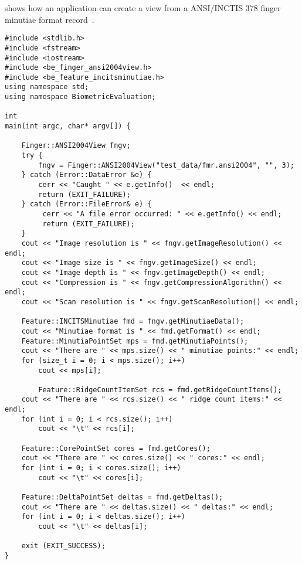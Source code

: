  shows how an application can create a view from
a ANSI/INCTIS 378 finger minutiae format record~\cite{std:ansi378-2004}.

\begin{lstlisting}[caption={Using an INCITS Finger View}, label=lst:incitsfingerviewuse]
#include <stdlib.h>
#include <fstream>
#include <iostream>
#include <be_finger_ansi2004view.h>
#include <be_feature_incitsminutiae.h>
using namespace std;
using namespace BiometricEvaluation;

int
main(int argc, char* argv[]) {

    Finger::ANSI2004View fngv;
    try {
        fngv = Finger::ANSI2004View("test_data/fmr.ansi2004", "", 3);
    } catch (Error::DataError &e) {
        cerr << "Caught " << e.getInfo()  << endl;
        return (EXIT_FAILURE);
    } catch (Error::FileError& e) {
         cerr << "A file error occurred: " << e.getInfo() << endl;
         return (EXIT_FAILURE);
    }
    cout << "Image resolution is " << fngv.getImageResolution() << endl;
    cout << "Image size is " << fngv.getImageSize() << endl;
    cout << "Image depth is " << fngv.getImageDepth() << endl;
    cout << "Compression is " << fngv.getCompressionAlgorithm() << endl;
    cout << "Scan resolution is " << fngv.getScanResolution() << endl;
    
    Feature::INCITSMinutiae fmd = fngv.getMinutiaeData();
    cout << "Minutiae format is " << fmd.getFormat() << endl;
    Feature::MinutiaPointSet mps = fmd.getMinutiaPoints();
    cout << "There are " << mps.size() << " minutiae points:" << endl;
    for (size_t i = 0; i < mps.size(); i++)
        cout << mps[i];

        Feature::RidgeCountItemSet rcs = fmd.getRidgeCountItems();
    cout << "There are " << rcs.size() << " ridge count items:" << endl;
    for (int i = 0; i < rcs.size(); i++)
        cout << "\t" << rcs[i];

    Feature::CorePointSet cores = fmd.getCores();
    cout << "There are " << cores.size() << " cores:" << endl;
    for (int i = 0; i < cores.size(); i++)
        cout << "\t" << cores[i];

    Feature::DeltaPointSet deltas = fmd.getDeltas();
    cout << "There are " << deltas.size() << " deltas:" << endl;
    for (int i = 0; i < deltas.size(); i++)
        cout << "\t" << deltas[i];

    exit (EXIT_SUCCESS);
}
\end{lstlisting}
